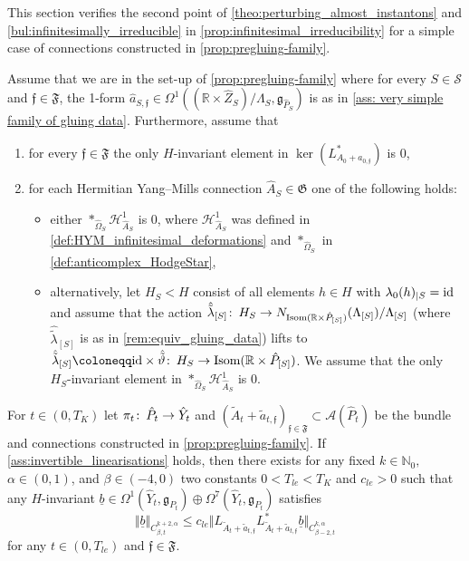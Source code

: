 \documentclass[11pt,a4paper]{scrartcl}
\newcommand{\col}{\colon \thinspace}
\newcommand{\id}{\textup{id}}
\newcommand{\VertWHt}[3]{\Vert_{C^{{#1},\alpha}_{{#2},t}{#3}}}
\numberwithin{equation}{section}
\theoremstyle{plain}
\theoremstyle{definition}
\theoremstyle{remark}
\begin{document}
This section verifies the second point of \autoref{theo:perturbing_almost_instantons} and \autoref{bul:infinitesimally_irreducible} in \autoref{prop:infinitesimal_irreducibility} for a simple case of connections constructed in \autoref{prop:pregluing-family}. 
\begin{assumption}\label{ass:invertible_linearisations}
Assume that we are in the set-up of \autoref{prop:pregluing-family} where for every $S\in \mathcal{S}$ and $\mathfrak{f} \in \mathfrak{F}$, the 1-form $\hat{a}_{S,\mathfrak{f}}\in \Omega^1((\mathbb{R}\times\hat{Z}_S)/\Lambda_S,\mathfrak{g}_{\hat{P}_S})$ is as in \autoref{ass: very simple family of gluing data}. Furthermore, assume that
\begin{enumerate}
\item  for every $\mathfrak{f} \in \mathfrak{F}$ the only $H$-invariant element in $\ker(L_{A_0+a_{0,\mathfrak{f}}}^*)$ is $0$,
\item  for each Hermitian Yang--Mills connection $\hat{A}_S\in \mathfrak{G}$ one of the following holds: 
\begin{itemize}
\item either $*_{\hat{\Omega}_S}\mathcal{H}^1_{\hat{A}_S}$ is $0$, where $\mathcal{H}^1_{\hat{A}_S}$ was defined in \autoref{def:HYM_infinitesimal_deformations} and $*_{\hat{\Omega}_S}$ in \autoref{def:anticomplex_HodgeStar},
\item alternatively, let $H_S<H$ consist of all elements $h \in H$ with $\lambda_0(h)_{\vert S}=\id$ and assume that the action $\hat{\tilde{\lambda}}_{[S]} \col H_S \to N_{\textup{Isom}(\mathbb{R}\times\hat{P}_{[S]})}(\Lambda_{[S]})/\Lambda_{[S]}$ (where $\hat{\tilde{\lambda}}_{[S]}$ is as in \autoref{rem:equiv_gluing_data}) lifts to $\hat{\tilde{\lambda}}_{[S]} \coloneqq  \id \times \hat{\tilde{\vartheta}} \col H_S \to \textup{Isom}(\mathbb{R}\times\hat{P}_{[S]})$. We assume that the only $H_S$-invariant element in $*_{\hat{\Omega}_S}\mathcal{H}^1_{\hat{A}_S}$ is $0$.
\end{itemize}
\end{enumerate}
\end{assumption}

\begin{proposition}\label{prop:LinearEstimate}
For $t\in (0,T_K)$ let $\pi_t \col \hat{P}_t \to \hat{Y}_t$ and $(\tilde{A}_t+\tilde{a}_{t,\mathfrak{f}})_{\mathfrak{f} \in \mathfrak{F}} \subset \mathcal{A}(\hat{P}_t)$ be the bundle and connections constructed in \autoref{prop:pregluing-family}. If \autoref{ass:invertible_linearisations} holds, then there exists for any fixed $k \in \mathbb{N}_0,$ $\alpha\in(0,1)$, and $\beta\in(-4,0)$ two constants $0<T_{le}<T_K$ and $c_{le}>0$ such that any $H$-invariant $\underline{b} \in \Omega^1(\hat{Y}_t,\mathfrak{g}_{P_t}) \oplus \Omega^7(\hat{Y}_t, \mathfrak{g}_{P_t})$ satisfies \[ \Vert \underline{b} \VertWHt{k+2}{\beta}{} \leq c_{le} \Vert L_{\tilde{A}_t+\tilde{a}_{t,\mathfrak{f}}}L_{\tilde{A}_t+\tilde{a}_{t,\mathfrak{f}}}^* \underline{b} \VertWHt{k}{\beta-2}{} \]  for any $t\in (0,T_{le})$ and $\mathfrak{f} \in \mathfrak{F}$.
\end{proposition} 
\end{document}
